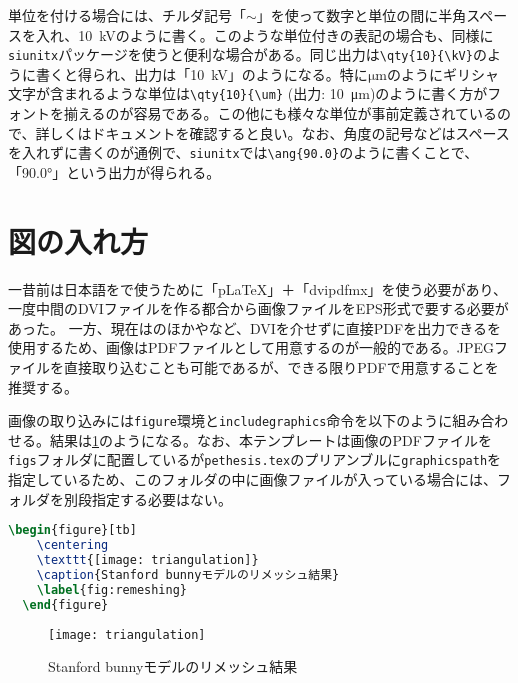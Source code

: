 単位を付ける場合には、チルダ記号「$\sim$」を使って数字と単位の間に半角スペースを入れ、10~kVのように書く。このような単位付きの表記の場合も、同様に\texttt{siunitx}パッケージを使うと便利な場合がある。同じ出力は\texttt{\textbackslash qty\{10\}\{\textbackslash kV\}}のように書くと得られ、出力は「\qty{10}{\kV}」のようになる。特に$\mathrm{\mu m}$のようにギリシャ文字が含まれるような単位は\texttt{\textbackslash qty\{10\}\{\textbackslash um\}} (出力: \qty{10}{\um})のように書く方がフォントを揃えるのが容易である。この他にも様々な単位が事前定義されているので、詳しくはドキュメントを確認すると良い。なお、角度の記号などはスペースを入れずに書くのが通例で、\texttt{siunitx}では\texttt{\textbackslash ang\{90.0\}}のように書くことで、「\ang{90.0}」という出力が得られる。

\section{図の入れ方}
\label{sec:insert-figure}

一昔前は日本語を\latex で使うために「pLaTeX」＋「dvipdfmx」を使う必要があり、一度中間のDVIファイルを作る都合から画像ファイルをEPS形式で要する必要があった。 一方、現在は\pdflatex のほか\lualatex や\xelatex など、DVIを介せずに直接PDFを出力できる\tex を使用するため、画像はPDFファイルとして用意するのが一般的である。JPEGファイルを直接取り込むことも可能であるが、できる限りPDFで用意することを推奨する。

画像の取り込みには\texttt{figure}環境と\texttt{includegraphics}命令を以下のように組み合わせる。結果は\cref{fig:remeshing}のようになる。なお、本テンプレートは画像のPDFファイルを\texttt{figs}フォルダに配置しているが\texttt{pethesis.tex}のプリアンブルに\texttt{graphicspath}を指定しているため、このフォルダの中に画像ファイルが入っている場合には、フォルダを別段指定する必要はない。

\begin{lstlisting}[language=tex,caption={図の貼り方}]
  \begin{figure}[tb]
    \centering
    \texttt{[image: triangulation]}
    \caption{Stanford bunnyモデルのリメッシュ結果}
    \label{fig:remeshing}
  \end{figure}  
\end{lstlisting}

\begin{figure}[!h]
  \centering
  \texttt{[image: triangulation]}
  \caption{Stanford bunnyモデルのリメッシュ結果}
  \label{fig:remeshing}
\end{figure}

